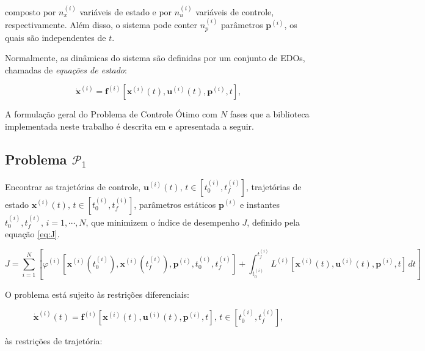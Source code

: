 \noindent composto por $n_x^{(i)}$ variáveis de estado e por $n_u^{(i)}$ variáveis de controle, respectivamente. Além disso, o sistema pode conter $n_p^{(i)}$ parâmetros $\mathbf{p}^{(i)}$, os quais são independentes de $t$.

Normalmente, as dinâmicas do sistema são definidas por um conjunto de EDOs, chamadas de \textit{equações de estado}:

\begin{equation*}
    \dot{\mathbf{x}}^{(i)} = \mathbf{f}^{(i)} \left[ \mathbf{x}^{(i)}(t), \mathbf{u}^{(i)}(t), \mathbf{p}^{(i)}, t \right],
\end{equation*}

A formulação geral do Problema de Controle Ótimo com $N$ fases que a biblioteca implementada neste trabalho é descrita em \cite{becerra_psopt_2022} e apresentada a seguir.

\subsection*{Problema $\mathcal{P}_1$}
\label{subsec:problema-1}

\noindent Encontrar as trajetórias de controle, $\mathbf{u}^{(i)}(t), \, t \in \left[ t_0^{(i)}, t_f^{(i)} \right]$, trajetórias de estado $\mathbf{x}^{(i)}(t), \, t \in \left[ t_0^{(i)}, t_f^{(i)} \right]$, parâmetros estáticos $\mathbf{p}^{(i)}$ e instantes $t_0^{(i)}, t_f^{(i)}, \, i = 1, \cdots, N$, que minimizem o índice de desempenho $J$, definido pela equação \ref{eq:J}.

\begin{equation}
    \label{eq:J}
    J = \sum_{i=1}^{N} \left[ 
        \varphi^{(i)} \left[ \mathbf{x}^{(i)} \left( t_0^{(i)} \right), \mathbf{x}^{(i)} \left( t_f^{(i)} \right), \mathbf{p}^{(i)}, t_0^{(i)}, t_f^{(i)} \right]
        + \int_{t_0^{(i)}}^{t_f^{(i)}} L^{(i)} \left[ \mathbf{x}^{(i)}(t), \mathbf{u}^{(i)}(t), \mathbf{p}^{(i)}, t \right] \, dt
    \right]
\end{equation}

\noindent O problema está sujeito às restrições diferenciais:

\begin{equation}
\label{eq:restrições-diferenciais}
    \dot{\mathbf{x}}^{(i)}(t) = \mathbf{f}^{(i)} \left[ \mathbf{x}^{(i)}(t), \mathbf{u}^{(i)}(t), \mathbf{p}^{(i)}, t \right], \, t \in \left[ t_0^{(i)}, t_f^{(i)} \right],
\end{equation}

\noindent às restrições de trajetória:

